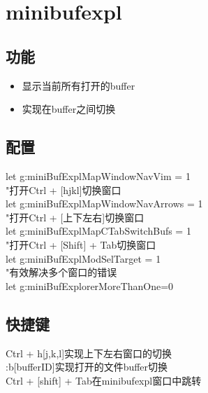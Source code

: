 \chapter{minibufexpl}

\section{功能}
\begin{itemize}
    \item 显示当前所有打开的buffer
    \item 实现在buffer之间切换
\end{itemize}

\section{配置}
let g:miniBufExplMapWindowNavVim = 1 \\
"打开Ctrl + [hjkl]切换窗口\\
let g:miniBufExplMapWindowNavArrows = 1 \\
"打开Ctrl + [上下左右]切换窗口\\
let g:miniBufExplMapCTabSwitchBufs = 1 \\
"打开Ctrl + [Shift] + Tab切换窗口\\
let g:miniBufExplModSelTarget = 1 \\
"有效解决多个窗口的错误\\
let g:miniBufExplorerMoreThanOne=0\\


\section{快捷键}
Ctrl + h[j,k,l]实现上下左右窗口的切换\\
:b[bufferID]实现打开的文件buffer切换\\
Ctrl + [shift] + Tab在minibufexpl窗口中跳转\\

\newpage
